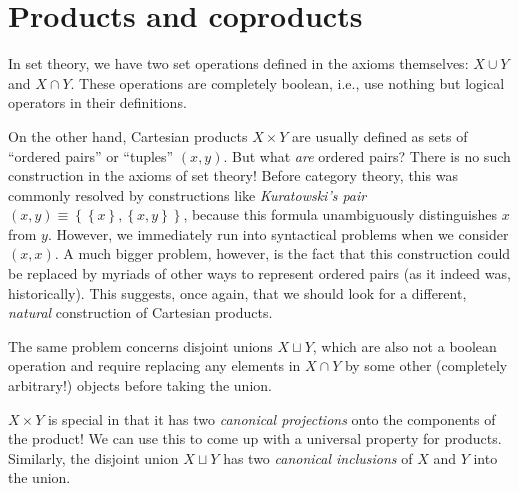 






\section{Products and coproducts \label{Sec.Products}}

In set theory, we have two set operations defined in the axioms themselves:
$X\cup Y$ and $X\cap Y$. These operations are completely boolean,
i.e., use nothing but logical operators in their definitions. 

On the other hand, Cartesian products $X\times Y$ are usually defined
as sets of ``ordered pairs'' or ``tuples'' $(x,y)$. But what
\emph{are} ordered pairs? There is no such construction in the axioms of
set theory! Before category theory, this was commonly resolved by constructions like \emph{Kuratowski's
pair} $\left(x,y\right)\equiv\left\{ \left\{ x\right\} ,\left\{ x,y\right\} \right\} $,
because this formula unambiguously distinguishes $x$ from $y$. However,
we immediately run into syntactical problems when we consider $\left(x,x\right)$.
A much bigger problem, however, is the fact that this construction
could be replaced by myriads of other ways to represent ordered pairs
(as it indeed was, historically). This suggests, once again, that
we should look for a different, \emph{natural} construction of Cartesian
products.

The same problem concerns disjoint unions $X\sqcup Y$, which are
also not a boolean operation and require replacing any elements in
$X\cap Y$ by some other (completely arbitrary!) objects before taking
the union.

$X\times Y$ is special in that it has two \emph{canonical projections}
onto the components of the product! We can use this to come up with
a universal property for products. Similarly, the disjoint union $X\sqcup Y$
has two \emph{canonical inclusions} of $X$ and $Y$ into the union.

